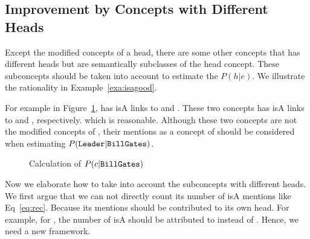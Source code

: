 \subsection{Improvement by Concepts with Different Heads}
Except the modified concepts of a head, there are some other concepts that has different heads but  are semantically subclasses of the head concept. These subconcepts should be taken into account to estimate the ${P}(h|e)$.  We illustrate the rationality in Example~\ref{exa:isagood}.

\begin{example}
\label{exa:isagood}
For example in Figure~\ref{fig:pgge},  has isA links to  and . These two concepts has isA links to  and , respectively.  which is reasonable. Although these two concepts are not the modified concepts of , their mentions as a concept of   should be considered when estimating $P(\at{Leader}|\at{Bill Gates})$.
\end{example}

\begin{figure}[!hptb]
\label{fig:pgge}
\centering
{}%
\caption{Calculation of $P({c}|{\tt Bill Gates})$ }
\end{figure}

%
Now we elaborate how to take into account the subconcepts with different heads. We first argue that we can not directly count its number of isA mentions like Eq~\ref{eq:rec}. Because its mentions should be contributed to its own head. For example, for , the number of  isA  should be attributed to  instead of .
Hence, we need a new framework.

